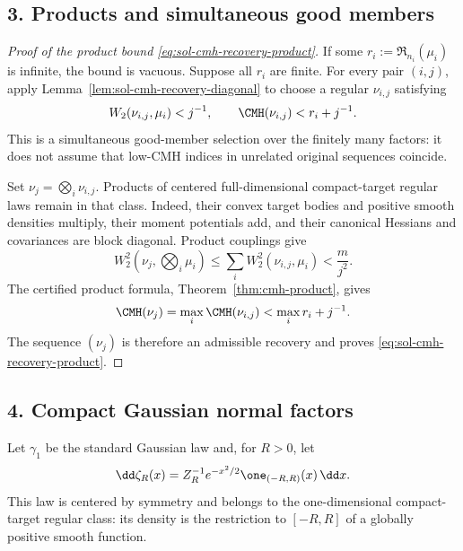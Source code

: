 \documentclass[../main.tex]{subfiles}
\begin{document}
\subsection*{3. Products and simultaneous good members}

\begin{proof}[Proof of the product bound \eqref{eq:sol-cmh-recovery-product}]
If some $r_i:=\mathfrak R_{n_i}(\mu_i)$ is infinite, the bound is vacuous.  Suppose all $r_i$
are finite.  For every pair $(i,j)$, apply
Lemma~\ref{lem:sol-cmh-recovery-diagonal} to choose a regular $\nu_{i,j}$ satisfying
\begin{equation}
  W_2(\nu_{i,j},\mu_i)<j^{-1},
  \qquad
  \CMH(\nu_{i,j})<r_i+j^{-1}.
  \label{eq:sol-cmh-recovery-product-diagonal}
\end{equation}
This is a simultaneous good-member selection over the finitely many factors: it does not
assume that low-CMH indices in unrelated original sequences coincide.

Set $\nu_j=\bigotimes_i\nu_{i,j}$.  Products of centered full-dimensional compact-target
regular laws remain in that class.  Indeed, their convex target bodies and positive smooth
densities multiply, their moment potentials add, and their canonical Hessians and covariances
are block diagonal.  Product couplings give
\begin{equation}
  W_2^2\!\left(\nu_j,\bigotimes_i\mu_i\right)
  \le\sum_iW_2^2(\nu_{i,j},\mu_i)
  <\frac{m}{j^2}.
  \label{eq:sol-cmh-recovery-product-w2}
\end{equation}
The certified product formula, Theorem~\ref{thm:cmh-product}, gives
\[
  \CMH(\nu_j)=\max_i\CMH(\nu_{i,j})
  <\max_i r_i+j^{-1}.
\]
The sequence $(\nu_j)$ is therefore an admissible recovery and proves
\eqref{eq:sol-cmh-recovery-product}.
\end{proof}

\subsection*{4. Compact Gaussian normal factors}

Let $\gamma_1$ be the standard Gaussian law and, for $R>0$, let
\begin{equation}
  \dd\zeta_R(x)
  =Z_R^{-1}e^{-x^2/2}\one_{(-R,R)}(x)\,\dd x.
  \label{eq:sol-cmh-recovery-truncated-gaussian}
\end{equation}
This law is centered by symmetry and belongs to the one-dimensional compact-target regular
class: its density is the restriction to $[-R,R]$ of a globally positive smooth function.
\end{document}
